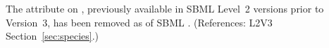 The  attribute on \Species, previously available in
SBML Level~2 versions prior to Version~3, has been removed as of SBML
\thisLV.  (References: L2V3 Section~\ref{sec:species}.)
